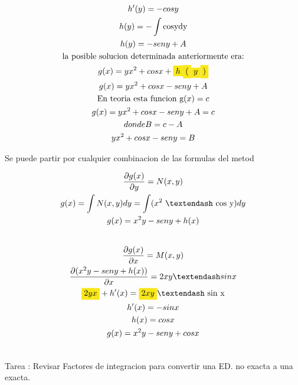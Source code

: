\documentclass{article}
\begin{document}
\begin{gather*}
h'(y) = -cosy \\
h(y) =-\int \text{cosydy} \\
h(y) = -seny+A \\
\text{la posible solucion determinada anteriormente era:} \\
g(x) = yx^{2}+cosx+\text{\colorbox[RGB]{248,231,28}{$h$}}\text{\colorbox[RGB]{248,231,28}{$($}}\text{\colorbox[RGB]{248,231,28}{$y$}}\text{\colorbox[RGB]{248,231,28}{$)$}} \\
g(x) = yx^{2}+cosx-seny+A \\
\text{En teoria esta funcion g}(x) = c \\
g(x) = yx^{2}+cosx-seny+A=c \\
donde B = c-A \\
yx^{2}+cosx-seny=B
\end{gather*}


Se puede partir por cualquier combinacion de las formulas del metod


\begin{gather*}
\frac{\partial g(x)}{\partial y} =N(x,y) \\
g(x) = \int N(x,y)dy = \int (x^{2}\text{ – cos y})dy \\
g(x) =x^{2}y-seny+h(x) \\
\vspace{0.5em} \\
\frac{\partial g(x)}{\partial x} =M(x,y) \\
\frac{\partial (x^{2}y-seny+h(x))}{\partial x} =2xy – sin x  \\
\text{\colorbox[RGB]{248,231,28}{$2yx$}}+h'(x) =\text{\colorbox[RGB]{248,231,28}{$2xy $}}\text{– sin x} \\
h'(x) = -sinx \\
h(x)=cosx \\
g(x) =x^{2}y-seny+cosx
\end{gather*}



\begin{gather*}

\end{gather*}


Tarea : Revisar Factores de integracion para convertir una ED. no exacta a una exacta.
\end{document}
